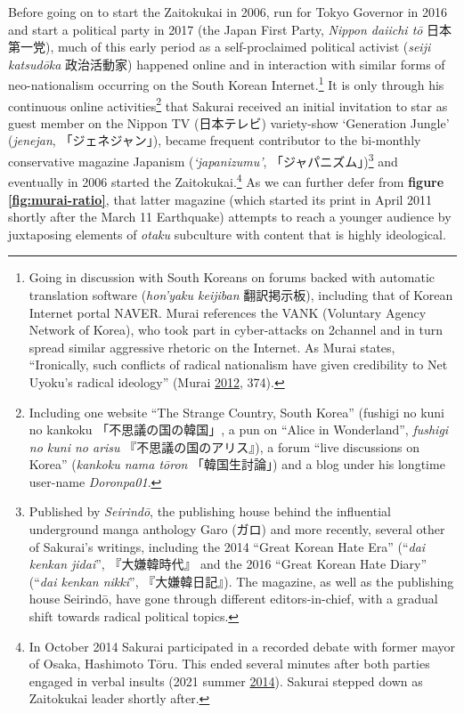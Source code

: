 \documentclass[10pt,british,A4paper,oneside]{memoir}
\begin{document}
Before going on to start the Zaitokukai in 2006, run for Tokyo Governor
in 2016 and start a political party in 2017 (the Japan First Party,
\emph{Nippon daiichi tō} 日本第一党), much of this early period as a
self-proclaimed political activist (\emph{seiji katsudōka} 政治活動家)
happened online and in interaction with similar forms of neo-nationalism
occurring on the South Korean Internet.\footnote{Going in discussion
  with South Koreans on forums backed with automatic translation
  software (\emph{hon'yaku keijiban} 翻訳掲示板), including that of
  Korean Internet portal NAVER. Murai references the VANK (Voluntary
  Agency Network of Korea), who took part in cyber-attacks on 2channel
  and in turn spread similar aggressive rhetoric on the Internet. As
  Murai states, ``Ironically, such conflicts of radical nationalism have
  given credibility to Net Uyoku's radical ideology'' (Murai
  \protect\hyperlink{ref-murai_net_2012}{2012}, 374).} It is only
through his continuous online activities\footnote{Including one website
  ``The Strange Country, South Korea'' (fushigi no kuni no kankoku
  「不思議の国の韓国」, a pun on ``Alice in Wonderland'', \emph{fushigi
  no kuni no arisu} 『不思議の国のアリス』), a forum ``live discussions
  on Korea'' (\emph{kankoku nama tōron} 「韓国生討論」) and a blog under
  his longtime user-name \emph{Doronpa01}.} that Sakurai received an
initial invitation to star as guest member on the Nippon TV (日本テレビ)
variety-show `Generation Jungle' (\emph{jenejan}, 「ジェネジャン」),
became frequent contributor to the bi-monthly conservative magazine
Japanism (\emph{`japanizumu'}, 「ジャパニズム」)\footnote{Published by
  \emph{Seirindō}, the publishing house behind the influential
  underground manga anthology Garo (ガロ) and more recently, several
  other of Sakurai's writings, including the 2014 ``Great Korean Hate
  Era'' (``\emph{dai kenkan jidai}'', 『大嫌韓時代』 and the 2016
  ``Great Korean Hate Diary'' (``\emph{dai kenkan nikki}'',
  『大嫌韓日記』). The magazine, as well as the publishing house
  Seirindō, have gone through different editors-in-chief, with a gradual
  shift towards radical political topics.} and eventually in 2006
started the Zaitokukai.\footnote{In October 2014 Sakurai participated in
  a recorded debate with former mayor of Osaka, Hashimoto Tōru. This
  ended several minutes after both parties engaged in verbal insults
  (2021 summer \protect\hyperlink{ref-2021_summer_vs_2014}{2014}).
  Sakurai stepped down as Zaitokukai leader shortly after.} As we can
further defer from \textbf{figure \ref{fig:murai-ratio}}, that latter
magazine (which started its print in April 2011 shortly after the March
11 Earthquake) attempts to reach a younger audience by juxtaposing
elements of \emph{otaku} subculture with content that is highly
ideological.
\end{document}
